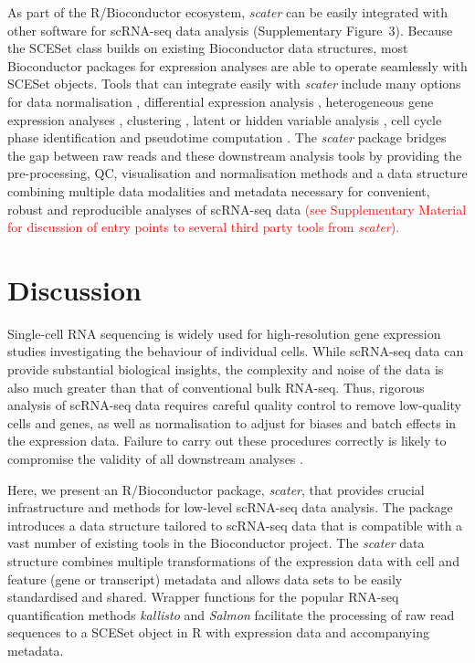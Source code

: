 \documentclass{bioinfo}
\newcommand{\revised}[1]{\textcolor{red}{#1}}
\begin{document}
As part of the R/Bioconductor ecosystem, \emph{scater} can be easily
integrated with other software for scRNA-seq data analysis (Supplementary Figure~3). Because the
SCESet class builds on existing Bioconductor data structures, most
Bioconductor packages for expression analyses are able to operate
seamlessly with SCESet objects. Tools that can integrate easily with
\emph{scater} include many options for data normalisation
\citep{Lun2016-sk,Vallejos2015-ww,Ding2015-jv}, differential expression analysis
\citep{Vallejos2016-qy,Trapnell2014-gj,Finak2015-rd,Vu2016-sk,Kharchenko2014-rx,Korthauer2015-wg,Andrews2016-at}, heterogeneous gene expression analyses
\citep{Vallejos2015-ww}, clustering
\citep{Kiselev2016-fu,Guo2015-wx,Fan2016-wh,Grun2015-fy}, latent or hidden
variable analysis
\citep{Leek2014-nu,Risso2014-np,Stegle2012-is,Chikina2015-lq},
cell cycle phase identification \citep{Scialdone2015-gj} and pseudotime
computation \citep{Trapnell2014-gj,Angerer2015-sw,Julia2015-jt,Campbell2016-es,Haghverdi2016-is}. The \emph{scater} package bridges
the gap between raw reads and these downstream analysis tools by providing the
pre-processing, QC, visualisation and normalisation methods and a data
structure combining multiple data modalities and metadata necessary for
convenient, robust and reproducible analyses of scRNA-seq data \revised{(see Supplementary Material for discussion of entry points to several third party tools from \emph{scater}).} 


\section{Discussion}\label{discussion}

Single-cell RNA sequencing is widely used for high-resolution gene
expression studies investigating the behaviour of individual cells.
While scRNA-seq data can provide substantial biological insights, the
complexity and noise of the data is also much greater than that of
conventional bulk RNA-seq. Thus, rigorous analysis of scRNA-seq data
requires careful quality control to remove low-quality cells and genes,
as well as normalisation to adjust for biases and batch effects in the
expression data. Failure to carry out these procedures correctly is
likely to compromise the validity of all downstream analyses
\citep{Leek2010-nq,Hicks2015-qy,Grun2015-xi}.

Here, we present an R/Bioconductor package, \emph{scater}, that provides
crucial infrastructure and methods for low-level scRNA-seq data
analysis. The package introduces a data structure tailored to scRNA-seq
data that is compatible with a vast number of existing tools in the
Bioconductor project. The \emph{scater} data structure combines multiple
transformations of the expression data with cell and feature (gene or
transcript) metadata and allows data sets to be easily standardised and
shared. Wrapper functions for the popular RNA-seq quantification methods
\emph{kallisto} and \emph{Salmon} facilitate the processing of raw read
sequences to a SCESet object in R with expression data and accompanying
metadata.
\end{document}
